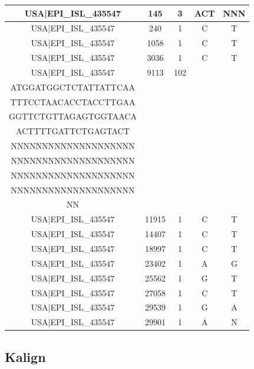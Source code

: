 \documentclass[a4paper,10pt]{article}
\begin{document}
\begin{longtable}{@{}ccccc@{}}
USA|EPI\_ISL\_435547 & 145 & 3 & ACT & NNN \\* \midrule
USA|EPI\_ISL\_435547 & 240 & 1 & C & T \\* \midrule
USA|EPI\_ISL\_435547 & 1058 & 1 & C & T \\* \midrule
USA|EPI\_ISL\_435547 & 3036 & 1 & C & T \\* \midrule
USA|EPI\_ISL\_435547 & 9113 & 102 & \begin{tabular}[c]{@{}c@{}}CTGACACACGTTATGTGCTC\\ ATGGATGGCTCTATTATTCAA\\ TTTCCTAACACCTACCTTGAA\\ GGTTCTGTTAGAGTGGTAACA\\ ACTTTTGATTCTGAGTACT\end{tabular} & \begin{tabular}[c]{@{}c@{}}NNNNNNNNNNNNNNNNNNNN\\ NNNNNNNNNNNNNNNNNNNN\\ NNNNNNNNNNNNNNNNNNNN\\ NNNNNNNNNNNNNNNNNNNN\\ NNNNNNNNNNNNNNNNNNNN\\ NN\end{tabular} \\* \midrule
USA|EPI\_ISL\_435547 & 11915 & 1 & C & T \\* \midrule
USA|EPI\_ISL\_435547 & 14407 & 1 & C & T \\* \midrule
USA|EPI\_ISL\_435547 & 18997 & 1 & C & T \\* \midrule
USA|EPI\_ISL\_435547 & 23402 & 1 & A & G \\* \midrule
USA|EPI\_ISL\_435547 & 25562 & 1 & G & T \\* \midrule
USA|EPI\_ISL\_435547 & 27058 & 1 & C & T \\* \midrule
USA|EPI\_ISL\_435547 & 29539 & 1 & G & A \\* \midrule
USA|EPI\_ISL\_435547 & 29901 & 1 & A & N \\* \bottomrule
\end{longtable}

\newpage
\subsection{Kalign}
\end{document}
